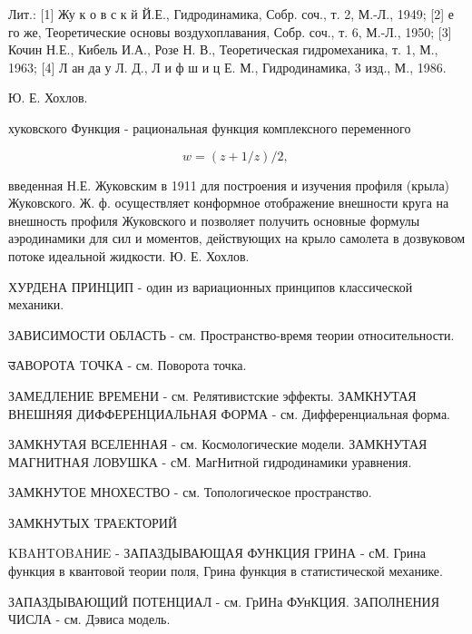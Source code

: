 \documentclass[10pt]{article}
\begin{document}
Лит.: [1] Жу к о в с к й Й.Е., Гидродинамика, Собр. соч., т. 2, М.-Л., 1949; [2] е го же, Теоретические основы воздухоплавания, Собр. соч., т. 6, М.-Л., 1950; [3] Кочин Н.Е., Кибель И.А., Розе Н. В., Теоретическая гидромеханика, т. 1, М., 1963; [4] Л ан да у Л. Д., Л и ф ш и ц Е. М., Гидродинамика, 3 изд., М., 1986.



Ю. Е. Хохлов.



хуковского Функция - рациональная функция комплексного переменного



\[

w=(z+1 / z) / 2 \text {, }

\]



введенная Н.Е. Жуковским в 1911 для построения и изучения профиля (крыла) Жуковского. Ж. ф. осуществляет конформное отображение внешности круга на внешность профиля Жуковского и позволяет получить основные формулы аэродинамики для сил и моментов, действующих на крыло самолета в дозвуковом потоке идеальной жидкости. Ю. Е. Хохлов.



ХУРДЕНА ПРИНЦИП - один из вариационных принципов классической механики.



ЗАВИСИМОСТИ ОБЛАСТЬ - см. Пространство-время теории относительности.



उАВОРОТА TОЧКА - см. Поворота точка.



ЗАМЕДЛЕНИЕ ВРЕМЕНИ - см. Релятивистские эффекты. ЗАМКНУТАЯ ВНЕШНЯЯ ДИФФЕРЕНЦИАЛЬНАЯ ФОРМА - см. Дифференциальная форма.



ЗАМКНУТАЯ ВСЕЛЕННАЯ - см. Космологические модели. ЗАМКНУТАЯ МАГНИТНАЯ ЛОВУШКА - сМ. МагНитной гидродинамики уравнения.



ЗАМКНУТОЕ МНОХЕСТВО - см. Топологическое пространство.



ЗАМКНУТЫХ TРАEКТОРИЙ



KBAHTOBAHИE - ЗАПАЗДЫВАЮЩАЯ ФУНКЦИЯ ГРИНА - сМ. Грина функция в квантовой теории поля, Грина функция в статистической механике.



ЗАПАЗДЫВАЮЩИЙ ПОТЕНЦИАЛ - см. ГрИНа ФУнКЦИЯ. ЗАПОЛНЕНИЯ ЧИСЛА - см. Дэвиса модель.
\end{document}
